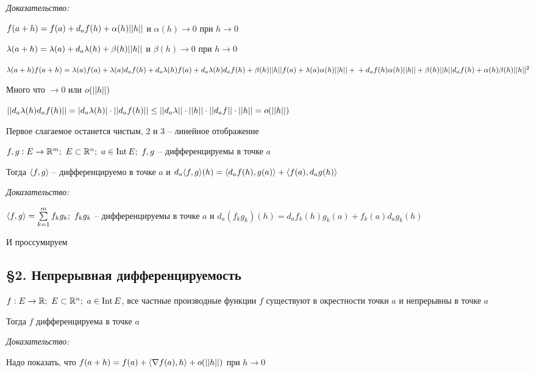 \documentclass[12pt]{article}
\begin{document}
\textit{Доказательство:}

$f(a + h) = f(a) + d_a f(h) + \alpha(h)|| h ||$ и $\alpha(h) \to 0$ при $h \to 0$

$\lambda(a + h) = \lambda(a) + d_a\lambda(h) + \beta(h)|| h ||$ и $\beta(h) \to 0$ при $h \to 0$

\newpage

$\lambda(a + h)f(a + h) = \lambda(a)f(a) + \lambda(a)d_af(h) + d_a\lambda(h)f(a) + d_a\lambda(h)d_af(h) + \beta(h)|| h ||f(a) + \lambda(a)\alpha(h)|| h || + \\ + d_af(h)\alpha(h)|| h || + \beta(h)|| h ||d_af(h) + \alpha(h)\beta(h)|| h ||^2$

Много что $\to 0$ или $o(|| h ||)$

$|| d_a\lambda(h)d_af(h) || = |d_a\lambda(h)| \cdot || d_af(h) || \leq || d_a\lambda || \cdot || h || \cdot || d_af || \cdot || h || = o(|| h ||)$

Первое слагаемое останется чистым, 2 и 3 -- линейное отображение

\begin{theo}{}
    $f, g : E \to \mathbb R^m;\ E \subset \mathbb R^n;\ a \in \operatorname{Int} E;\ f, g$ -- дифференцируемы в точке $a$

    Тогда $\langle f, g \rangle$ -- дифференцируемо в точке $a$ и $d_a\langle f, g \rangle(h) = \langle d_a f(h), g(a) \rangle + \langle f(a), d_a g(h) \rangle$
\end{theo}

\textit{Доказательство:}

$\q{f, g} = \sum\limits_{k = 1}^m f_k g_k;\ f_kg_k$ -- дифференцируемы в точке $a$ и $d_a(f_kg_k)(h) = d_a f_k(h)g_k(a) + f_k(a)d_a g_k(h)$

И проссумируем

\subsection{\S 2. Непрерывная дифференцируемость}

\begin{theo}{}
    $f : E \to \mathbb R;\ E \subset \mathbb R^n;\ a \in \operatorname{Int} E$, все частные производные функции $f$ существуют в окрестности точки $a$ и непрерывны в точке $a$

    Тогда $f$ дифференцируема в точке $a$
\end{theo}

\textit{Доказательство:}

Надо показать, что $f(a + h) = f(a) + \langle \nabla f(a), h \rangle + o(|| h ||)$ при $h \to 0$
\end{document}
